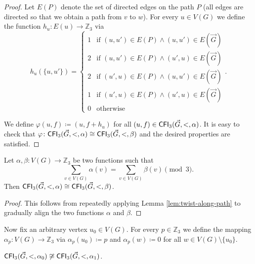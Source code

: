 \documentclass{theoretics}
\newcommand{\ZZ}{{\mathbb Z}}
\newcommand{\CFI}{{\sf CFI}}
\begin{document}
\begin{proof}
 Let $E(P)$ denote the set of directed edges on the path $P$ (all edges are directed so that we obtain a path from $v$ to $w$).
 For every $u \in V(G)$ we define the function $h_{u}\colon E(u) \to \ZZ_3$ via
 \[h_u(\{u,u'\}) = \begin{cases}
                    1 &\text{if } (u,u') \in E(P) \wedge (u,u') \in E(\vec{G})\\
                    2 &\text{if } (u,u') \in E(P) \wedge (u',u) \in E(\vec{G})\\
                    2 &\text{if } (u',u) \in E(P) \wedge (u,u') \in E(\vec{G})\\
                    1 &\text{if } (u',u) \in E(P) \wedge (u',u) \in E(\vec{G})\\
                    0 &\text{otherwise}
                   \end{cases}.\]

 We define $\varphi(u,f) \coloneqq (u,f + h_u)$ for all $(u,f) \in \CFI_3(\vec{G},<,\alpha)$.
 It is easy to check that $\varphi\colon \CFI_3(\vec{G},<,\alpha) \cong \CFI_3(\vec{G},<,\beta)$ and the desired properties are satisfied.
\end{proof}

\begin{corollary}
 \label{cor:cfi-isomorphism}
 Let $\alpha,\beta\colon V(G) \to \ZZ_3$ be two functions such that
 \[\sum_{v \in V(G)} \alpha(v) = \sum_{v \in V(G)} \beta(v) \pmod{3}.\]
 Then $\CFI_3(\vec{G},<,\alpha) \cong \CFI_3(\vec{G},<,\beta)$.
\end{corollary}

\begin{proof}
 This follows from repeatedly applying Lemma \ref{lem:twist-along-path} to gradually align the two functions $\alpha$ and $\beta$.
\end{proof}

Now fix an arbitrary vertex $u_0 \in V(G)$.
For every $p \in \ZZ_3$ we define the mapping $\alpha_p\colon V(G) \to \ZZ_3$ via $\alpha_p(u_0) \coloneqq p$ and $\alpha_p(w) \coloneqq 0$ for all $w \in V(G) \setminus \{u_0\}$.

\begin{lemma}
 \label{lem:cfi-non-isomorphism}
 $\CFI_3(\vec{G},<,\alpha_0) \not\cong \CFI_3(\vec{G},<,\alpha_1)$.
\end{lemma}
\end{document}
